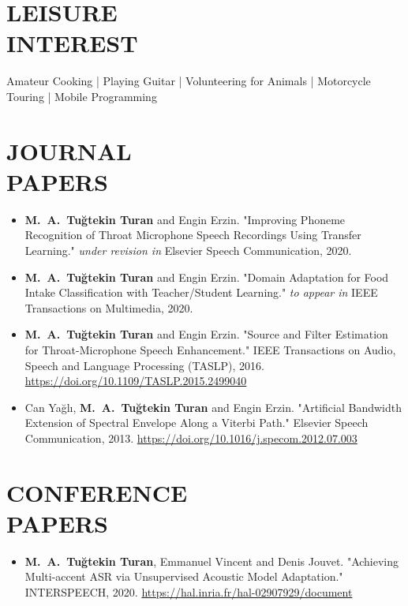 \documentclass[margin, 10pt]{res} %
\begin{document}
\begin{resume}
\vspace{.5em}
\section{LEISURE \\ INTEREST}
Amateur Cooking | Playing Guitar | Volunteering for Animals | Motorcycle Touring | Mobile Programming

\vspace{1em}
\section{JOURNAL \\ PAPERS}

\begin{itemize}[leftmargin=*]
    \item \textbf{M.~A.~Tu\u{g}tekin Turan} and Engin Erzin. "Improving Phoneme Recognition of Throat Microphone Speech Recordings Using Transfer Learning." \textit{under revision in} Elsevier Speech Communication, 2020.

    \item \textbf{M.~A.~Tu\u{g}tekin Turan} and Engin Erzin. "Domain Adaptation for Food Intake Classification with Teacher/Student Learning." \textit{to appear in} IEEE Transactions on Multimedia, 2020.

    \item \textbf{M.~A.~Tu\u{g}tekin Turan} and Engin Erzin. "Source and Filter Estimation for Throat-Microphone Speech Enhancement." IEEE Transactions on Audio, Speech and Language Processing (TASLP), 2016. \\ \url{https://doi.org/10.1109/TASLP.2015.2499040}

    \item Can Ya\u{g}l\i, \textbf{M.~A.~Tu\u{g}tekin Turan} and Engin Erzin. "Artificial Bandwidth Extension of Spectral Envelope Along a Viterbi Path." Elsevier Speech Communication, 2013. \hspace{.1em}
    \url{https://doi.org/10.1016/j.specom.2012.07.003}
\end{itemize}

\vspace{1em}
\section{CONFERENCE \\ PAPERS}

\begin{itemize}[leftmargin=*]
    \item \textbf{M.~A.~Tu\u{g}tekin Turan}, Emmanuel Vincent and Denis Jouvet. "Achieving Multi-accent ASR via Unsupervised Acoustic Model Adaptation." INTERSPEECH, 2020. \hspace{.1em} \url{https://hal.inria.fr/hal-02907929/document}


\end{itemize}
\end{resume}
\end{document}
